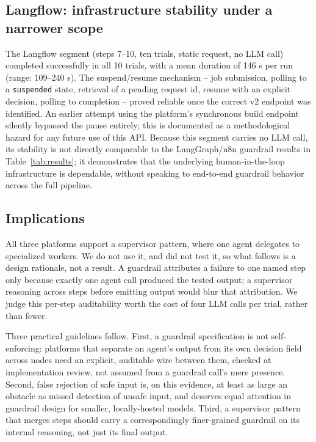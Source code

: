 \documentclass[conference]{IEEEtran}
\begin{document}
\subsection{Langflow: infrastructure stability under a narrower scope}
The Langflow segment (steps 7--10, ten trials, static request, no LLM call) completed successfully in all 10 trials, with a mean duration of 146 s per run (range: 109--240 s). The suspend/resume mechanism -- job submission, polling to a \texttt{suspended} state, retrieval of a pending request id, resume with an explicit decision, polling to completion -- proved reliable once the correct v2 endpoint was identified. An earlier attempt using the platform's synchronous build endpoint silently bypassed the pause entirely; this is documented as a methodological hazard for any future use of this API. Because this segment carries no LLM call, its stability is not directly comparable to the LangGraph/n8n guardrail results in Table~\ref{tab:results}; it demonstrates that the underlying human-in-the-loop infrastructure is dependable, without speaking to end-to-end guardrail behavior across the full pipeline.

\subsection{Implications}
All three platforms support a supervisor pattern, where one agent delegates to specialized workers. We do not use it, and did not test it, so what follows is a design rationale, not a result. A guardrail attributes a failure to one named step only because exactly one agent call produced the tested output; a supervisor reasoning across steps before emitting output would blur that attribution. We judge this per-step auditability worth the cost of four LLM calls per trial, rather than fewer.

Three practical guidelines follow. First, a guardrail specification is not self-enforcing: platforms that separate an agent's output from its own decision field across nodes need an explicit, auditable wire between them, checked at implementation review, not assumed from a guardrail call's mere presence. Second, false rejection of safe input is, on this evidence, at least as large an obstacle as missed detection of unsafe input, and deserves equal attention in guardrail design for smaller, locally-hosted models. Third, a supervisor pattern that merges steps should carry a correspondingly finer-grained guardrail on its internal reasoning, not just its final output.
\end{document}

